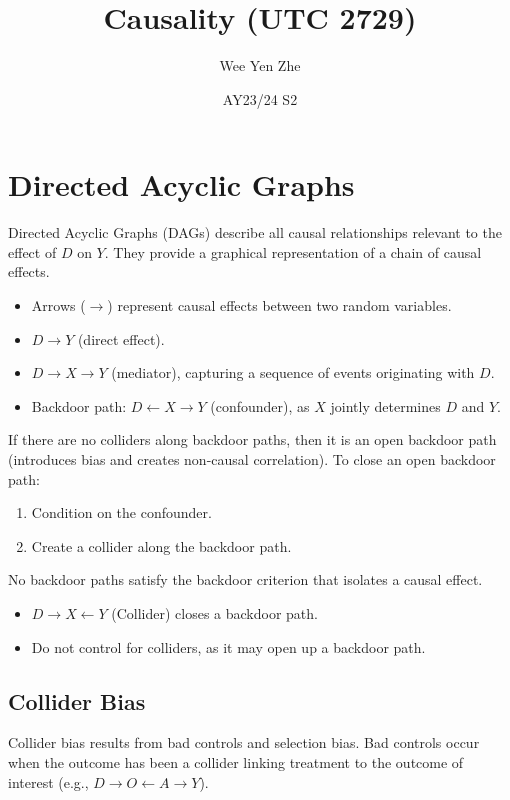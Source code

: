 \documentclass{article}
\title{Causality (UTC 2729)}
\author{Wee Yen Zhe}
\date{AY23/24 S2}
\begin{document}
\maketitle

\section*{Directed Acyclic Graphs}
Directed Acyclic Graphs (DAGs) describe all causal relationships relevant to the effect of \(D\) on \(Y\). They provide a graphical representation of a chain of causal effects.
\begin{itemize}
    \item Arrows (\(\rightarrow\)) represent causal effects between two random variables.
    \item \(D \rightarrow Y\) (direct effect).
    \item \(D \rightarrow X \rightarrow Y\) (mediator), capturing a sequence of events originating with \(D\).
    \item Backdoor path: \(D \leftarrow X \rightarrow Y\) (confounder), as \(X\) jointly determines \(D\) and \(Y\).
\end{itemize}

If there are no colliders along backdoor paths, then it is an open backdoor path (introduces bias and creates non-causal correlation). To close an open backdoor path:
\begin{enumerate}
    \item Condition on the confounder.
    \item Create a collider along the backdoor path.
\end{enumerate}
No backdoor paths satisfy the backdoor criterion that isolates a causal effect.

\begin{itemize}
    \item \(D \rightarrow X \leftarrow Y\) (Collider) closes a backdoor path.
    \item Do not control for colliders, as it may open up a backdoor path.
\end{itemize}

\subsection*{Collider Bias}
Collider bias results from bad controls and selection bias. Bad controls occur when the outcome has been a collider linking treatment to the outcome of interest (e.g., \(D \rightarrow O \leftarrow A \rightarrow Y\)).
\end{document}
